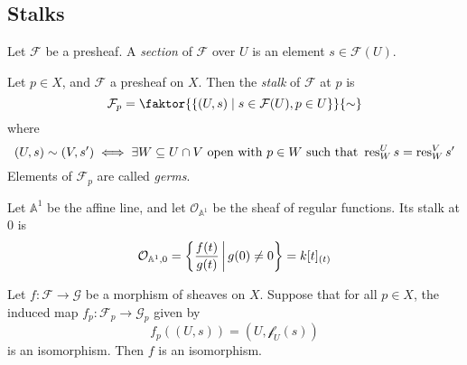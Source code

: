 \subsection{Stalks}
\begin{definition}
    Let \( \mathcal F \) be a presheaf.
    A \emph{section} of \( \mathcal F \) over \( U \) is an element \( s \in \mathcal F(U) \).
\end{definition}
\begin{definition}
    Let \( p \in X \), and \( \mathcal F \) a presheaf on \( X \).
    Then the \emph{stalk} of \( \mathcal F \) at \( p \) is
    \[ \mathcal F_p = \faktor{\qty{(U, s) \mid s \in \mathcal F(U), p \in U}}{\sim} \]
    where
    \[ (U, s) \sim (V, s') \iff \exists W \subseteq U \cap V \text{ open with } p \in W \text{ such that } \operatorname{res}^U_W s = \operatorname{res}^V_W s' \]
    Elements of \( \mathcal F_p \) are called \emph{germs}.
\end{definition}
\begin{example}
    Let \( \mathbb A^1 \) be the affine line, and let \( \mathcal O_{\mathbb A^1} \) be the sheaf of regular functions.
    Its stalk at 0 is
    \[ \mathcal O_{\mathbb A^1, 0} = \qty{\frac{f(t)}{g(t)} \,\middle|\,g(0) \neq 0} = k[t]_{(t)} \]
\end{example}
\begin{proposition}
    Let \( f : \mathcal F \to \mathcal G \) be a morphism of sheaves on \( X \).
    Suppose that for all \( p \in X \), the induced map \( f_p : \mathcal F_p \to \mathcal G_p \) given by
    \[ f_p((U, s)) = (U, \mathcal f_U(s)) \]
    is an isomorphism.
    Then \( f \) is an isomorphism.
\end{proposition}
